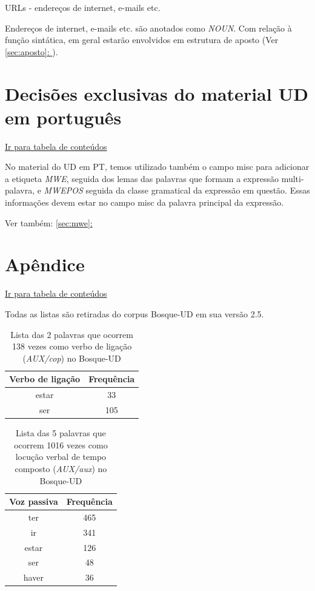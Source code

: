 \documentclass[output=paper,colorlinks,citecolor=brown]{langscibook}
\newcommand*{\fullref}[1]{\hyperref[{#1}]{\autoref*{#1}: \nameref*{#1}}} %
\begin{document}
		URLs - endereços de internet, e-mails etc.
		
			Endereços de internet, e-mails etc. são anotados como \emph{NOUN}. Com relação à função sintática, em geral estarão envolvidos em estrutura de aposto (Ver \fullref{sec:aposto}).

\chapter{Decisões exclusivas do material UD em português}

\hyperlink{toc}{Ir para tabela de conteúdos\\}

	No material do UD em PT, temos utilizado também o campo misc para adicionar a etiqueta \emph{MWE}, seguida dos lemas das palavras que formam a expressão multi-palavra, e \emph{MWEPOS} seguida da classe gramatical da expressão em questão. Essas informações devem estar no campo misc da palavra principal da expressão.

	Ver também: \fullref{sec:mwe}

	

\chapter{Apêndice}

	\hyperlink{toc}{Ir para tabela de conteúdos\\}

	Todas as listas são retiradas do corpus Bosque-UD em sua versão 2.5.
	
	\begin{table}[]
		\centering
		\begin{tabular}{|c|c|}
			\hline
			\textbf{Verbo de ligação} & \textbf{Frequência} \\\hline
			estar & 33\\\hline
			ser & 105\\\hline
		\end{tabular}
		\caption{Lista das 2 palavras que ocorrem 138 vezes como verbo de ligação (\emph{AUX/cop}) no Bosque-UD}
		\label{tab:verbosdeligacao}
	\end{table}

	\begin{table}[]
		\centering
		\begin{tabular}{|c|c|}
			\hline
			\textbf{Voz passiva} & \textbf{Frequência} \\\hline
			ter & 465\\\hline
			ir & 341\\\hline
			estar & 126\\\hline
			ser & 48\\\hline
			haver & 36\\\hline
		\end{tabular}
		\caption{Lista das 5 palavras que ocorrem 1016 vezes como locução verbal de tempo composto (\emph{AUX/aux}) no Bosque-UD}
		\label{tab:loctempocomposto}
	\end{table}
\end{document}

